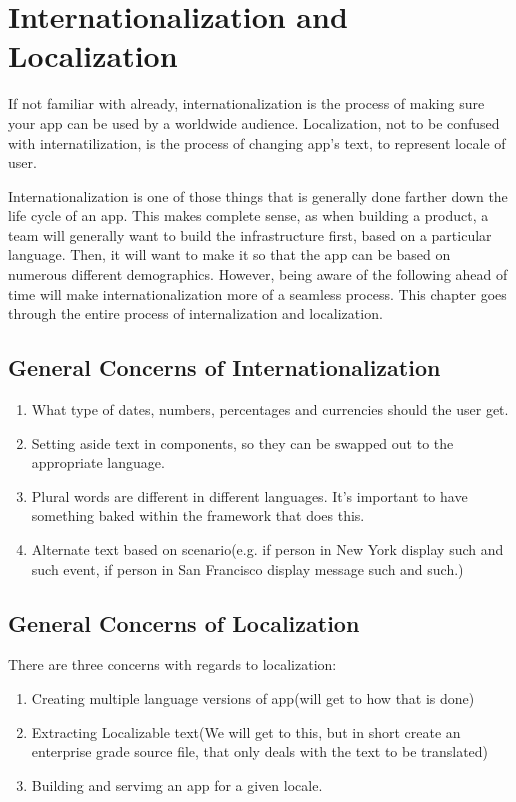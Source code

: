 \chapter{ Internationalization and Localization}

If not familiar with already, internationalization is the process of making sure
your app can be used by a worldwide audience. Localization, not to be confused 
with internatilization, is the process of changing app's text, to represent 
locale of user.

Internationalization is one of those things that is generally done farther down
the life cycle of an app. This makes complete sense, as when building a product, 
a team will generally want to build the infrastructure first, based on a 
particular language. Then, it will want to make it so that the app can be based 
on numerous different demographics. However, being aware of the following ahead 
of time will make internationalization more of a seamless process. This chapter 
goes through the entire process of internalization and localization.

\section{General Concerns of Internationalization }

\begin{enumerate}
  \item What type of dates, numbers, percentages and currencies should the user
  get.
  \item Setting aside text in components, so they can be swapped out to the 
  appropriate language. 
  \item Plural words are different in different languages. It's important 
  to have something baked within the framework that does this. 
  \item Alternate text based on scenario(e.g. if person in New York display 
  such and such event, if person in San Francisco display message such and 
  such.)
\end{enumerate}

\section{General Concerns of Localization }
There are three concerns with regards to localization: 
\begin{enumerate}
  \item Creating multiple language versions of app(will get to how that is done)
  \item Extracting Localizable text(We will get to this, but in short create 
  an enterprise grade source file, that only deals with the text to be
  translated)
  \item Building and servimg an app for a given locale. 
\end{enumerate}

